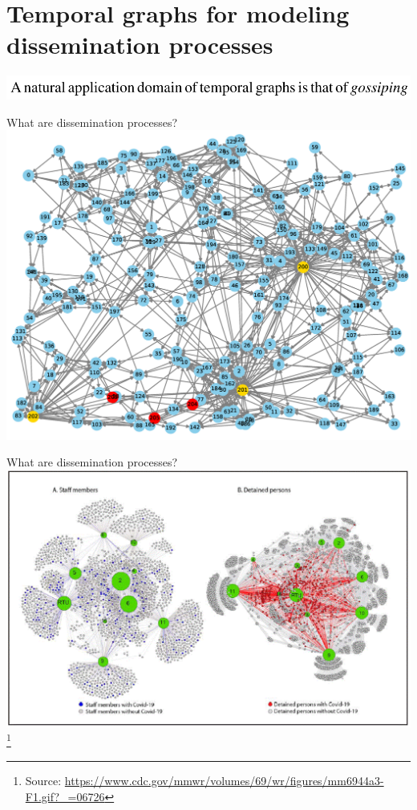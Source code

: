 \documentclass{beamer}
\newcommand{\sourcefootnote}[1]{\let\thefootnote\relax\footnote{{\tiny Source: \url{#1}}}}
\begin{document}
\section{Temporal graphs for modeling dissemination processes}
\begin{frame}
  \includegraphics[width=\linewidth]{media/gossip.png} \texttildelow{} \cite{Michail2015}
\end{frame}

\begin{frame}{What are dissemination processes?}
  \centering
  \includegraphics[width=0.9\linewidth]{media/dissemination_process_graph.png}
  \cite{fakeNews}
\end{frame}
\begin{frame}{What are dissemination processes?}
  \includegraphics[width=\linewidth]{media/largeNetwork.png}
  \sourcefootnote{https://www.cdc.gov/mmwr/volumes/69/wr/figures/mm6944a3-F1.gif?_=06726}
\end{frame}
\end{document}
